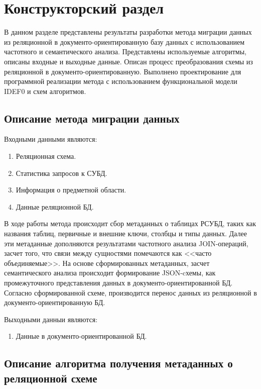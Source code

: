 \chapter{Конструкторский раздел}
В данном разделе представлены результаты разработки метода миграции данных 
из реляционной в документо-ориентированную базу данных 
с использованием частотного и семантического анализа.
Представлены используемые алгоритмы, описаны входные и выходные данные.
Описан процесс преобразования схемы из реляционной в документо-ориентированную.
Выполнено проектирование для программной реализации метода с
использованием функциональной модели IDEF0 и схем алгоритмов.

\section{Описание метода миграции данных}
Входными данными являются:
\begin{enumerate}
    \item Реляционная схема.
    \item Статистика запросов к СУБД.
    \item Информация о предметной области.
    \item Данные реляционной БД.
\end{enumerate}

В ходе работы метода происходит сбор метаданных о таблицах РСУБД, 
таких как названия таблиц, первичные и внешние ключи, столбцы и типы данных.
Далее эти метаданные дополняются результатами частотного анализа JOIN-операций, 
засчет того, что связи между сущностями помечаются как <<часто объединяемые>>. 
На основе сформированных метаданных, 
засчет семантического анализа происходит формирование JSON-cхемы, 
как промежуточного представления данных в документо-ориентированной БД.
Согласно сформированной схеме, производится перенос данных из реляционной в документо-ориентированную БД.

Выходными данныи являются:
\begin{enumerate}
    \item Данные в документо-ориентированной БД.
\end{enumerate}
\clearpage



\section{Описание алгоритма получения метаданных о реляционной схеме}

